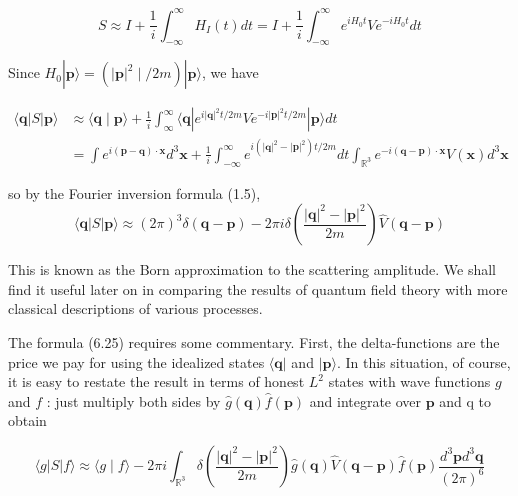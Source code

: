 \documentclass[10pt, letterpaper]{article}
\begin{document}
$$
S \approx I+\frac{1}{i} \int_{-\infty}^{\infty} H_{I}(t) d t=I+\frac{1}{i} \int_{-\infty}^{\infty} e^{i H_{0} t} V e^{-i H_{0} t} d t
$$

Since $H_{0}|\mathbf{p}\rangle=\left(|\mathbf{p}|^{2} \mid / 2 m\right)|\mathbf{p}\rangle$, we have

$$
\begin{aligned}
\langle\mathbf{q}| S|\mathbf{p}\rangle & \approx\langle\mathbf{q} \mid \mathbf{p}\rangle+\frac{1}{i} \int_{\infty}^{\infty}\langle\mathbf{q}| e^{i|\mathbf{q}|^{2} t / 2 m} V e^{-i|\mathbf{p}|^{2} t / 2 m}|\mathbf{p}\rangle d t \\
& =\int e^{i(\mathbf{p}-\mathbf{q}) \cdot \mathbf{x}} d^{3} \mathbf{x}+\frac{1}{i} \int_{-\infty}^{\infty} e^{i\left(|\mathbf{q}|^{2}-|\mathbf{p}|^{2}\right) t / 2 m} d t \int_{\mathbb{R}^{3}} e^{-i(\mathbf{q}-\mathbf{p}) \cdot \mathbf{x}} V(\mathbf{x}) d^{3} \mathbf{x}
\end{aligned}
$$

so by the Fourier inversion formula (1.5),
$$
\langle\mathbf{q}| S|\mathbf{p}\rangle \approx(2 \pi)^{3} \delta(\mathbf{q}-\mathbf{p})-2 \pi i \delta\left(\frac{|\mathbf{q}|^{2}-|\mathbf{p}|^{2}}{2 m}\right) \widehat{V}(\mathbf{q}-\mathbf{p})
$$

This is known as the Born approximation to the scattering amplitude. We shall find it useful later on in comparing the results of quantum field theory with more classical descriptions of various processes.

The formula (6.25) requires some commentary. First, the delta-functions are the price we pay for using the idealized states $\langle\mathbf{q}|$ and $|\mathbf{p}\rangle$. In this situation, of course, it is easy to restate the result in terms of honest $L^{2}$ states with wave functions $g$ and $f$ : just multiply both sides by $\widehat{g}(\mathbf{q}) \widehat{f}(\mathbf{p})$ and integrate over $\mathbf{p}$ and q to obtain

$$
\langle g| S|f\rangle \approx\langle g \mid f\rangle-2 \pi i \int_{\mathbb{R}^{3}} \delta\left(\frac{|\mathbf{q}|^{2}-|\mathbf{p}|^{2}}{2 m}\right) \widehat{g}(\mathbf{q}) \widehat{V}(\mathbf{q}-\mathbf{p}) \widehat{f}(\mathbf{p}) \frac{d^{3} \mathbf{p} d^{3} \mathbf{q}}{(2 \pi)^{6}}
$$
\end{document}
